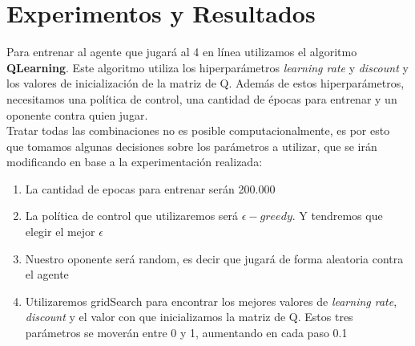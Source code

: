 \section{Experimentos y Resultados}
%
%
%
%
%



Para entrenar al agente que jugará al 4 en línea utilizamos el algoritmo \textbf{QLearning}. Este algoritmo utiliza los hiperparámetros \textit{learning rate} y \textit{discount} y los valores de inicialización de la matriz de Q. Además de estos hiperparámetros, necesitamos una política de control, una cantidad de épocas para entrenar y un oponente contra quien jugar.  \\

Tratar todas las combinaciones no es posible computacionalmente, es por esto que tomamos algunas decisiones sobre los parámetros a utilizar, que se irán modificando en base a la experimentación realizada:

\begin{enumerate}
\item La cantidad de epocas para entrenar serán 200.000
\item La política de control que utilizaremos será \textbf{$\epsilon-greedy$}. Y tendremos que elegir el mejor $\epsilon$
\item Nuestro oponente será random, es decir que jugará de forma aleatoria contra el agente
\item Utilizaremos gridSearch para encontrar los mejores valores de \textit{learning rate},  \textit{discount} y el valor con que inicializamos la matriz de Q. Estos tres parámetros se moverán entre 0 y 1, aumentando en cada paso 0.1
\end{enumerate}

